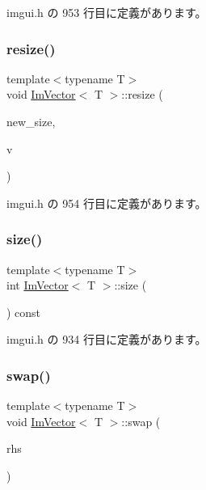  imgui.\+h の 953 行目に定義があります。

\mbox{\label{class_im_vector_abe7f21776ecfb7d0214963fd8c0689f0}} 
\subsubsection{\texorpdfstring{resize()}{resize()}\hspace{0.1cm}{\footnotesize\ttfamily [2/2]}}
{\footnotesize\ttfamily template$<$typename T$>$ \\
void \mbox{\hyperlink{class_im_vector}{Im\+Vector}}$<$ T $>$\+::resize (\begin{DoxyParamCaption}\item[{int}]{new\+\_\+size,  }\item[{const T \&}]{v }\end{DoxyParamCaption})\hspace{0.3cm}{\ttfamily [inline]}}



 imgui.\+h の 954 行目に定義があります。

\mbox{\label{class_im_vector_a8c903ecb1aaee0601b6a8ad835a4a435}} 
\subsubsection{\texorpdfstring{size()}{size()}}
{\footnotesize\ttfamily template$<$typename T$>$ \\
int \mbox{\hyperlink{class_im_vector}{Im\+Vector}}$<$ T $>$\+::size (\begin{DoxyParamCaption}{ }\end{DoxyParamCaption}) const\hspace{0.3cm}{\ttfamily [inline]}}



 imgui.\+h の 934 行目に定義があります。

\mbox{\label{class_im_vector_afcec0d2a1e28aebe412b6efd06f0a77a}} 
\subsubsection{\texorpdfstring{swap()}{swap()}}
{\footnotesize\ttfamily template$<$typename T$>$ \\
void \mbox{\hyperlink{class_im_vector}{Im\+Vector}}$<$ T $>$\+::swap (\begin{DoxyParamCaption}\item[{\mbox{\hyperlink{class_im_vector}{Im\+Vector}}$<$ T $>$ \&}]{rhs }\end{DoxyParamCaption})\hspace{0.3cm}{\ttfamily [inline]}}



